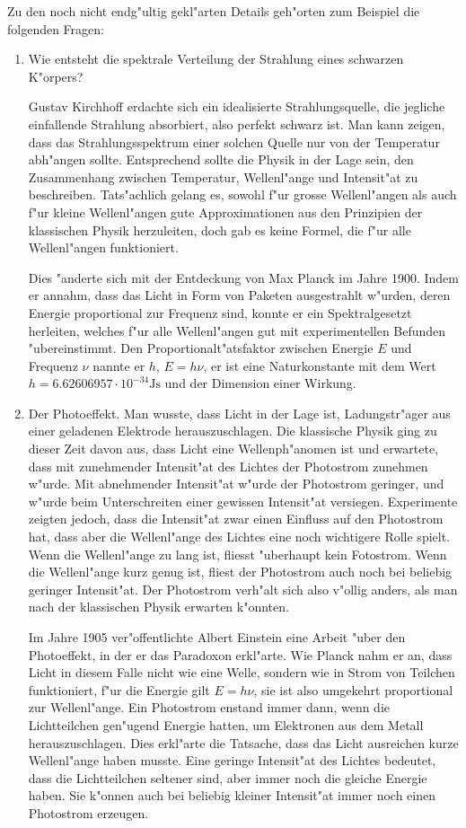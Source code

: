 Zu den noch nicht endg"ultig gekl"arten Details geh"orten
zum Beispiel die folgenden Fragen:
\begin{enumerate}
\item Wie entsteht die spektrale Verteilung der Strahlung eines
schwarzen K"orpers? 

Gustav Kirchhoff erdachte sich ein idealisierte Strahlungsquelle, 
die jegliche einfallende Strahlung absorbiert, also perfekt schwarz
ist. Man kann zeigen, dass das Strahlungsspektrum einer solchen Quelle
nur von der Temperatur abh"angen sollte. Entsprechend sollte die Physik
in der Lage sein, den Zusammenhang zwischen Temperatur, Wellenl"ange
und Intensit"at zu beschreiben. Tats"achlich gelang es, sowohl f"ur 
grosse Wellenl"angen als auch f"ur kleine Wellenl"angen gute Approximationen
aus den Prinzipien der klassischen Physik herzuleiten, doch gab es keine
Formel, die f"ur alle Wellenl"angen funktioniert.

Dies "anderte sich mit der Entdeckung von Max Planck im Jahre 1900.
Indem er annahm, dass das Licht in Form von Paketen ausgestrahlt w"urden,
deren Energie proportional zur Frequenz sind, konnte er ein Spektralgesetzt
herleiten, welches f"ur alle Wellenl"angen gut mit experimentellen
Befunden "ubereinstimmt. Den Proportionalt"atsfaktor zwischen Energie $E$
und Frequenz $\nu$ nannte er $h$, $E=h\nu$, er ist eine Naturkonstante
mit dem Wert $h=6.62606957\cdot 10^{-34}\text{Js}$ und der Dimension
einer Wirkung.


\item Der Photoeffekt. Man wusste, dass Licht in der
Lage ist, Ladungstr"ager aus einer geladenen Elektrode herauszuschlagen.
Die klassische Physik ging zu dieser Zeit davon aus, dass Licht
eine Wellenph"anomen ist und
erwartete, dass mit zunehmender Intensit"at des
Lichtes der Photostrom zunehmen w"urde. Mit abnehmender Intensit"at
w"urde der Photostrom geringer, und w"urde beim Unterschreiten einer gewissen
Intensit"at versiegen.
Experimente zeigten jedoch, dass die
Intensit"at zwar einen Einfluss auf den Photostrom hat, dass aber
die Wellenl"ange des Lichtes eine noch wichtigere Rolle spielt.
Wenn die Wellenl"ange zu lang ist, fliesst "uberhaupt kein Fotostrom.
Wenn die Wellenl"ange kurz genug ist, fliest der Photostrom auch noch
bei beliebig geringer Intensit"at.
Der Photostrom verh"alt sich also v"ollig anders, als man nach der
klassischen Physik erwarten k"onnten.

Im Jahre 1905 ver"offentlichte Albert Einstein eine Arbeit "uber den
Photoeffekt, in der er das Paradoxon erkl"arte. Wie Planck nahm er an,
dass Licht in diesem Falle nicht wie eine Welle, sondern wie in Strom
von Teilchen funktioniert, f"ur die Energie gilt $E=h\nu$, sie ist also
umgekehrt proportional zur Wellenl"ange.
Ein Photostrom
enstand immer dann, wenn die Lichtteilchen gen"ugend Energie hatten, um
Elektronen aus dem Metall herauszuschlagen. Dies erkl"arte die Tatsache,
dass das Licht ausreichen kurze Wellenl"ange haben musste. Eine geringe
Intensit"at des Lichtes bedeutet, dass die Lichtteilchen seltener sind,
aber immer noch die gleiche Energie haben. Sie k"onnen auch bei beliebig 
kleiner Intensit"at immer noch einen Photostrom erzeugen.


\end{enumerate}
